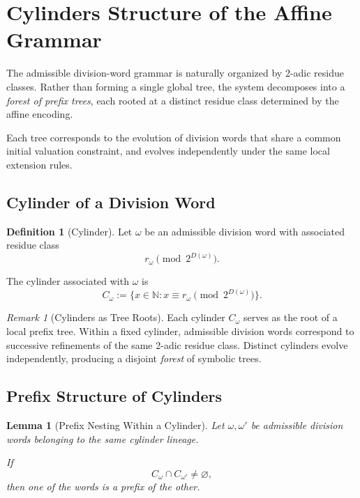 \documentclass[12pt, oneside]{article}
\numberwithin{equation}{section}
\theoremstyle{definition}
\newtheorem{definition}{Definition}[section]
\theoremstyle{plain}
\newtheorem{lemma}[theorem]{Lemma}
\theoremstyle{remark}
\newtheorem*{remark}{Remark}
\begin{document}
\section{Cylinders Structure of the Affine Grammar}
\label{sec:cylinders-structure}

The admissible division-word grammar is naturally organized by
2-adic residue classes. Rather than forming a single global tree,
the system decomposes into a \emph{forest of prefix trees}, each
rooted at a distinct residue class determined by the affine encoding.

Each tree corresponds to the evolution of division words that share
a common initial valuation constraint, and evolves independently
under the same local extension rules.

\subsection{Cylinder of a Division Word}
\begin{definition}[Cylinder]
Let $\omega$ be an admissible division word with associated residue
class
\[
r_\omega \pmod{2^{D(\omega)}}.
\]

The cylinder associated with $\omega$ is
\[
C_\omega
:=
\{x \in \mathbb N :
x \equiv r_\omega \pmod{2^{D(\omega)}}\}.
\]
\end{definition}

\begin{remark}[Cylinders as Tree Roots]
Each cylinder $C_\omega$ serves as the root of a local prefix tree.
Within a fixed cylinder, admissible division words correspond to
successive refinements of the same 2-adic residue class. Distinct
cylinders evolve independently, producing a disjoint \emph{forest}
of symbolic trees.
\end{remark}

\subsection{Prefix Structure of Cylinders}

\begin{lemma}[Prefix Nesting Within a Cylinder]
Let $\omega,\omega'$ be admissible division words belonging to the
same cylinder lineage.

If
\[
C_\omega \cap C_{\omega'} \neq \varnothing,
\]
then one of the words is a prefix of the other.
\end{lemma}
\end{document}

